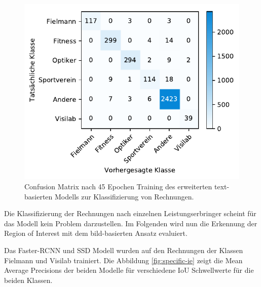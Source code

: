 \begin{figure}[h!] 
    \captionsetup{width=.9\linewidth}
    \caption[Confusion Matrix des um die Klassen Fielmann und Visilab ergänzten text-basierten Modells zur Klassifizierung von Rechnungen]{Confusion Matrix nach 45 Epochen Training des erweiterten text-basierten Modells zur Klassifizierung von Rechnungen.}
    \label{fielmann-cm}
    \centering
    \includegraphics[scale=1]{graphics/matplot/class__fielmann__cm_44.pdf}
\end{figure}

Die Klassifizierung der Rechnungen nach einzelnen Leistungserbringer scheint für das Modell kein Problem darzustellen. Im Folgenden wird nun die Erkennung der Region of Interest mit dem bild-basierten Ansatz evaluiert.

Das Faster-RCNN und SSD Modell wurden auf den Rechnungen der Klassen Fielmann und Visilab trainiert. Die Abbildung \ref{fig:specific-ie} zeigt die Mean Average Precisions der beiden Modelle für verschiedene IoU Schwellwerte für die beiden Klassen.

